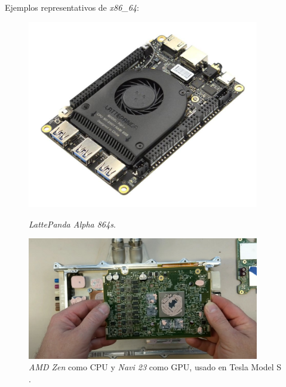 Ejemplos representativos de \textit{x86\_64}:
\begin{figure} [h!]
	\begin{center}
		\begin{minipage}{0.45\textwidth}
			\begin{center}
				\includegraphics[width=0.9\textwidth]{figs/lattepanda}
			\end{center}
			\caption{\textit{LattePanda Alpha 864s}.}
		\end{minipage}\hfill
		\begin{minipage}{0.45\textwidth}
			\begin{center}
				\includegraphics[width=0.9\textwidth]{figs/teslazenrdna2}
			\end{center}
			\caption{\textit{AMD Zen} como CPU y \textit{Navi 23} como GPU, usado en Tesla Model S \cite{teslazenrdna2}.}
		\end{minipage}
	\end{center}
	\label{fig:x86}
\end{figure}\


